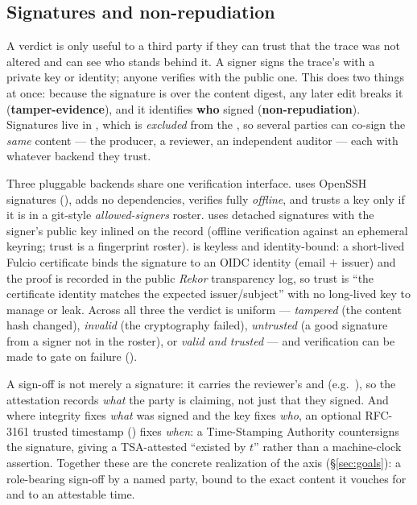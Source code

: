 \subsection{Signatures and non-repudiation}\label{sec:interchange-sign}

A verdict is only useful to a third party if they can trust that the trace was not altered and can see who
stands behind it. A signer signs the trace's  with a private key or identity; anyone
verifies with the public one. This does two things at once: because the signature is over the content
digest, any later edit breaks it (\textbf{tamper-evidence}), and it identifies \textbf{who} signed
(\textbf{non-repudiation}). Signatures live in , which is \emph{excluded} from the
, so several parties can co-sign the \emph{same} content --- the producer, a reviewer, an
independent auditor --- each with whatever backend they trust.

Three pluggable backends share one verification interface.  uses OpenSSH signatures
(), adds no dependencies, verifies fully \emph{offline}, and trusts a key only if it is
in a git-style \emph{allowed-signers} roster.  uses detached signatures with the signer's public
key inlined on the record (offline verification against an ephemeral keyring; trust is a fingerprint
roster).  is keyless and identity-bound: a short-lived Fulcio certificate binds the
signature to an OIDC identity (email $+$ issuer) and the proof is recorded in the public \emph{Rekor}
transparency log, so trust is ``the certificate identity matches the expected issuer/subject'' with no
long-lived key to manage or leak. Across all three the verdict is uniform --- \emph{tampered} (the
content hash changed), \emph{invalid} (the cryptography failed), \emph{untrusted} (a good signature from a
signer not in the roster), or \emph{valid and trusted} --- and verification can be made to gate on failure
().

A sign-off is not merely a signature: it carries the reviewer's  and  (e.g.\
), so the attestation records \emph{what} the party is claiming,
not just that they signed. And where integrity fixes \emph{what} was signed and the key fixes \emph{who},
an optional RFC-3161 trusted timestamp (\code{--tsa}) fixes \emph{when}: a Time-Stamping Authority
countersigns the signature, giving a TSA-attested ``existed by $t$'' rather than a machine-clock assertion.
Together these are the concrete realization of the \code{certified} axis (\S\ref{sec:goals}): a role-bearing
sign-off by a named party, bound to the exact content it vouches for and to an attestable time.

